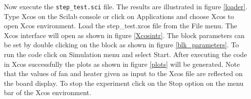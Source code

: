 Now execute the {\tt step\_test.sci} file.  The results are illustrated in figure \ref{loader}. Type {\ttfamily Xcos} on the Scilab console or click on { \ttfamily Applications} and choose {\ttfamily Xcos} to open Xcos environment. Load the {\ttfamily step\_test.xcos} file from the { \ttfamily File} menu. The Xcos interface will open as shown in figure \ref{Xcosintr}. The block parameters can be set by double clicking on the block as shown in figure \ref{blk_parameters}. To run the code click on {\ttfamily Simulation} menu and select { \ttfamily Start}. After executing the code in Xcos successfully the plots as shown in figure \ref{plots} will be generated. Note that the values of fan and heater given as input to the Xcos file are reflected on the board display. To stop the experiment click on the {\ttfamily Stop} option on the menu bar of the Xcos environment.
